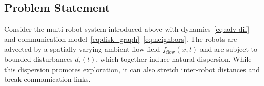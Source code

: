 \documentclass[conference]{IEEEconf}
\newcommand{\Ni}{\mathcal{N}}        %
\newcommand{\CN}[2]{\Ni(#1)\cap\Ni(#2)} %
\newcommand{\Nii}[1]{\Ni^{(2)}(#1)}  %
\theoremstyle{plain}
\newtheorem{assumption}{Assumption}
\begin{document}



\subsection{Problem Statement}
\label{subsec:problem_statement}

Consider the multi-robot system introduced above with dynamics~\eqref{eq:adv-dif} and communication model~\eqref{eq:disk_graph}--\eqref{eq:neighbors}. The robots are advected by a spatially varying ambient flow field $f_{\text{flow}}(x,t)$ and are subject to bounded disturbances $d_i(t)$, which together induce natural dispersion. While this dispersion promotes exploration, it can also stretch inter-robot distances and break communication links.
\end{document}

